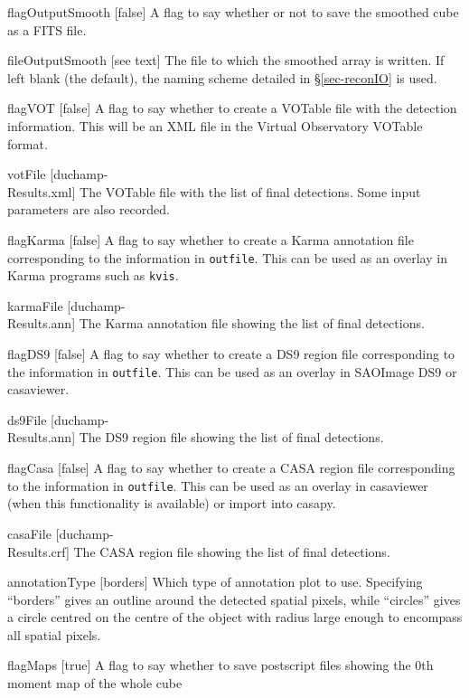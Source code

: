 \begin{Lentry}
\item[{flagOutputSmooth [false]}] A flag to say whether or not
  to save the smoothed cube as a FITS file. 
\item[fileOutputSmooth{ [see text]}] The file to which the smoothed array
  is written. If left blank (the default), the naming scheme detailed
  in \S\ref{sec-reconIO} is used.
\item[{flagVOT [false]}] A flag to say whether to create a
  VOTable file with the detection information. This will be an XML
  file in the Virtual Observatory VOTable format.
\item[{votFile [duchamp-\\Results.xml]}] The VOTable file with
  the list of final detections. Some input parameters are also
  recorded. 
\item[{flagKarma [false]}] A flag to say whether to create a
  Karma annotation file corresponding to the information in
  \texttt{outfile}. This can be used as an overlay in Karma
  programs such as \texttt{kvis}.
\item[{karmaFile [duchamp-\\Results.ann]}] The Karma annotation
  file showing the list of final detections.
\item[{flagDS9 [false]}] A flag to say whether to create a
  DS9 region file corresponding to the information in
  \texttt{outfile}. This can be used as an overlay in SAOImage DS9 or
  casaviewer. 
\item[{ds9File [duchamp-\\Results.ann]}] The DS9 region file showing
  the list of final detections.
\item[{flagCasa [false]}] A flag to say whether to create a
  CASA region file corresponding to the information in
  \texttt{outfile}. This can be used as an overlay in casaviewer (when
  this functionality is available) or import into casapy. 
\item[{casaFile [duchamp-\\Results.crf]}] The CASA region file showing
  the list of final detections.
\item[{annotationType [borders]}] Which type of annotation plot to
  use. Specifying ``borders'' gives an outline around the detected
  spatial pixels, while ``circles'' gives a circle centred on the
  centre of the object with radius large enough to encompass all
  spatial pixels.
\item[{flagMaps [true]}] A flag to say whether to save postscript
  files showing the 0th moment map of the whole cube

\end{Lentry}
